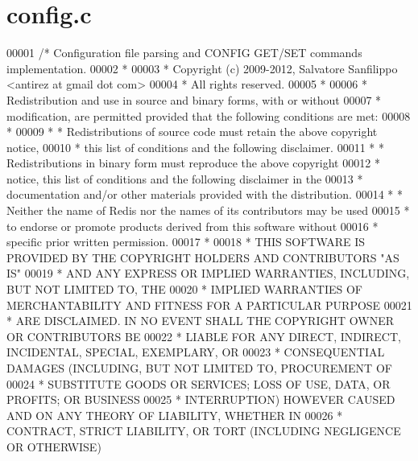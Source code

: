 \hypertarget{config_8c_source}{}\section{config.\+c}
\label{config_8c_source}

\begin{DoxyCode}
00001 \textcolor{comment}{/* Configuration file parsing and CONFIG GET/SET commands implementation.}
00002 \textcolor{comment}{ *}
00003 \textcolor{comment}{ * Copyright (c) 2009-2012, Salvatore Sanfilippo <antirez at gmail dot com>}
00004 \textcolor{comment}{ * All rights reserved.}
00005 \textcolor{comment}{ *}
00006 \textcolor{comment}{ * Redistribution and use in source and binary forms, with or without}
00007 \textcolor{comment}{ * modification, are permitted provided that the following conditions are met:}
00008 \textcolor{comment}{ *}
00009 \textcolor{comment}{ *   * Redistributions of source code must retain the above copyright notice,}
00010 \textcolor{comment}{ *     this list of conditions and the following disclaimer.}
00011 \textcolor{comment}{ *   * Redistributions in binary form must reproduce the above copyright}
00012 \textcolor{comment}{ *     notice, this list of conditions and the following disclaimer in the}
00013 \textcolor{comment}{ *     documentation and/or other materials provided with the distribution.}
00014 \textcolor{comment}{ *   * Neither the name of Redis nor the names of its contributors may be used}
00015 \textcolor{comment}{ *     to endorse or promote products derived from this software without}
00016 \textcolor{comment}{ *     specific prior written permission.}
00017 \textcolor{comment}{ *}
00018 \textcolor{comment}{ * THIS SOFTWARE IS PROVIDED BY THE COPYRIGHT HOLDERS AND CONTRIBUTORS "AS IS"}
00019 \textcolor{comment}{ * AND ANY EXPRESS OR IMPLIED WARRANTIES, INCLUDING, BUT NOT LIMITED TO, THE}
00020 \textcolor{comment}{ * IMPLIED WARRANTIES OF MERCHANTABILITY AND FITNESS FOR A PARTICULAR PURPOSE}
00021 \textcolor{comment}{ * ARE DISCLAIMED. IN NO EVENT SHALL THE COPYRIGHT OWNER OR CONTRIBUTORS BE}
00022 \textcolor{comment}{ * LIABLE FOR ANY DIRECT, INDIRECT, INCIDENTAL, SPECIAL, EXEMPLARY, OR}
00023 \textcolor{comment}{ * CONSEQUENTIAL DAMAGES (INCLUDING, BUT NOT LIMITED TO, PROCUREMENT OF}
00024 \textcolor{comment}{ * SUBSTITUTE GOODS OR SERVICES; LOSS OF USE, DATA, OR PROFITS; OR BUSINESS}
00025 \textcolor{comment}{ * INTERRUPTION) HOWEVER CAUSED AND ON ANY THEORY OF LIABILITY, WHETHER IN}
00026 \textcolor{comment}{ * CONTRACT, STRICT LIABILITY, OR TORT (INCLUDING NEGLIGENCE OR OTHERWISE)}

\end{DoxyCode}
